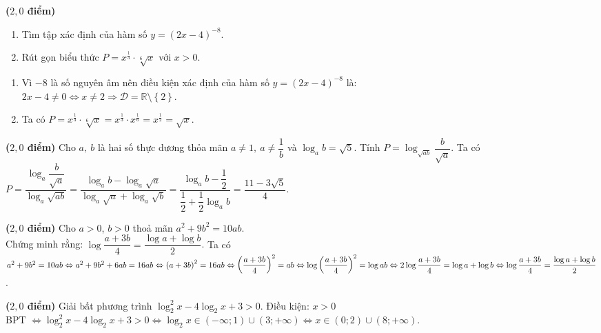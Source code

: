 \begin{bt}\textbf{($2,0$ điểm)}%
	\begin{enumerate}
		\item Tìm tập xác định của hàm số $y=(2x-4)^{-8}$.
		\item Rút gọn biểu thức $P=x^{\frac{1}{3}} \cdot \sqrt[6]{x}$  với $x>0.$
	\end{enumerate}
	\loigiai
	{ 
		\begin{enumerate}
			\item Vì $-8$ là số nguyên âm nên điều kiện xác định của hàm số $y=(2x-4)^{-8}$ là:\\ $2x-4\neq 0\Leftrightarrow x\neq 2\Rightarrow \mathscr{D}=\mathbb{R}\setminus \left\{2\right\}$.
			\item Ta có $P=x^{\frac{1}{3}} \cdot \sqrt[6]{x}=x^{\frac{1}{3}}\cdot x^{\frac{1}{6}}=x^{\frac{1}{2}}=\sqrt{x}.$ 
		\end{enumerate}
	}
\end{bt}

\begin{bt}\textbf{($2,0$ điểm)}%
	Cho $a,\ b$ là hai số thực dương thỏa mãn $a\ne 1,\ a\ne\dfrac{1}{b}$ và $\log_a b=\sqrt{5}$. Tính $P=\log_{\sqrt{ab}}\dfrac{b}{\sqrt{a}}$.	
	\loigiai
	{
		Ta có $P=\dfrac{\log_a\dfrac{b}{\sqrt{a}}}{\log_a\sqrt{ab}}=\dfrac{\log_ab-\log_a\sqrt{a}}{\log_a\sqrt{a}+\log_a\sqrt{b}}=\dfrac{\log_ab-\dfrac{1}{2}}{\dfrac{1}{2}+\dfrac{1}{2}\log_ab}=\dfrac{11-3\sqrt{5}}{4}$.	
	}
\end{bt}

\begin{bt}\textbf{($2,0$ điểm)}%
	Cho $a>0$, $b>0$ thoả mãn $a^2+9b^2=10ab$. \\Chứng minh rằng: $\log \dfrac{a+3b}{4}=\dfrac{\log a+\log b}{2}$.
	\loigiai
	{
		Ta có $a^2+9b^2=10ab \Leftrightarrow a^2+9b^2+6ab=16ab \Leftrightarrow \left( {a+3b} \right)^2=16ab \Leftrightarrow \left( {\dfrac{a+3b}{4}} \right)^2=ab 
		\\\Leftrightarrow \log \left( {\dfrac{a+3b}{4}} \right)^2=\log ab \Leftrightarrow 2\log \dfrac{a+3b}{4}=\log a+\log b \Leftrightarrow \log \dfrac{a+3b}{4}=\dfrac{\log a+\log b}{2}$.}
\end{bt}

\begin{bt}\textbf{($2,0$ điểm)}%
	Giải bất phương trình $\log_2^2x-4\log_2x+3>0$.
	\loigiai
	{
		Điều kiện: $x>0$\\
		BPT $\Leftrightarrow \log_2^2x-4\log_2x+3>0\Leftrightarrow\log_2x\in(-\infty;1)\cup(3;+\infty)\Leftrightarrow x\in (0;2)\cup(8;+\infty)$.
	}
\end{bt}


